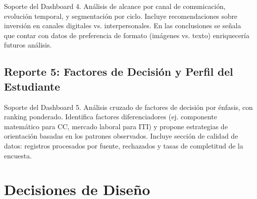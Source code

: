 \documentclass[12pt, letterpaper]{article}
\begin{document}
Soporte del Dashboard 4. Análisis de alcance por canal de comunicación, evolución temporal, y segmentación por ciclo. Incluye recomendaciones sobre inversión en canales digitales vs. interpersonales. En las conclusiones se señala que contar con datos de preferencia de formato (imágenes vs. texto) enriquecería futuros análisis.

\subsection{Reporte 5: Factores de Decisión y Perfil del Estudiante}

Soporte del Dashboard 5. Análisis cruzado de factores de decisión por énfasis, con ranking ponderado. Identifica factores diferenciadores (ej. componente matemático para CC, mercado laboral para ITI) y propone estrategias de orientación basadas en los patrones observados. Incluye sección de calidad de datos: registros procesados por fuente, rechazados y tasas de completitud de la encuesta.

\section{Decisiones de Diseño}
\end{document}
